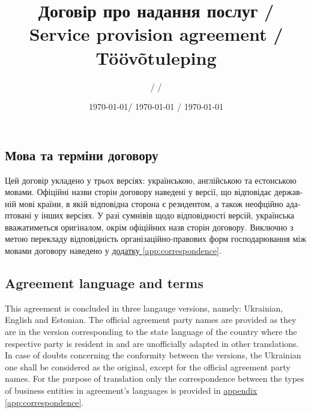 \documentclass[a4paper]{article}
\newcommand\freetextcommon[3]{\begin{ukrainian}#1\end{ukrainian}\switchcolumn\begin{english}#2\end{english}\switchcolumn\begin{estonian}#3\end{estonian}}
\newcommand\freetext[3]{\freetextcommon{#1}{#2}{#3}\switchcolumn*}
\newcommand\clause[6]{\freetext{\section{#1}#4}{\section{#2}#5}{\section{#3}#6}}
\newcommand\smartref[2]{\hyperref[#1]{#2 \ref{#1}}}
\begin{document}
  \begin{Form}
    \title{Договір про надання послуг / Service provision agreement / Töövõtuleping \raisebox{-6pt}{\TextField[borderwidth=0,charsize=14pt,name=contractno]{}}}
    \author{\raisebox{-2pt}{\TextField[borderwidth=0,charsize=10pt,height=12pt,name=placeUK]{}} / \raisebox{-2pt}{\TextField[borderwidth=0,charsize=10pt,height=12pt,name=placeEN]{}} / \raisebox{-2pt}{\TextField[borderwidth=0,charsize=10pt,height=12pt,name=placeET]{}}}
    \date{\today / \textenglish{\today} / \textestonian{\today}}
    \maketitle

    \begin{paracol}{3}
      \clause
        {Мова та терміни договору}
        {Agreement language and terms}
        {}
        {Цей договір укладено у трьох версіях: українською, англійською та естонською мовами. Офіційні назви сторін договору наведені у версії, що відповідає державній мові країни, в якій відповідна сторона є резидентом, а також неофційно адаптовані у інших версіях. У разі сумнівів щодо відповідності версій, українська вважатиметься оригіналом, окрім офіційних назв сторін договору. Виключно з метою перекладу відповідність ор\-га\-ні\-за\-цій\-но-правових форм господарювання між мовами договору наведено у \smartref{app:correspondence}{додатку}.}
        {This agreement is concluded in three langauge versions, namely: Ukrainian, English and Estonian. The official agreement party names are provided as they are in the version corresponding to the state language of the country where the respective party is resident in and are unofficially adapted in other translations. In case of doubts concerning the conformity between the versions, the Ukrainian one shall be considered as the original, except for the official agreement party names. For the purpose of translation only the correspondence between the types of business entities in agreement's languages is provided in \smartref{app:correspondence}{appendix}.}
        {}
    \end{paracol}
  \appendix
  
  
  
  \end{Form}
\end{document}

